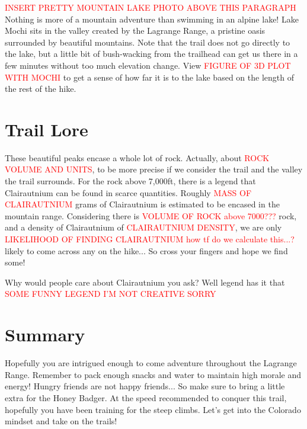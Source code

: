 \documentclass[12pt]{article}   %
\theoremstyle{definition}
\numberwithin{equation}{section}
\begin{document}
\quad \textcolor{red}{INSERT PRETTY MOUNTAIN LAKE PHOTO ABOVE THIS PARAGRAPH} Nothing is more of a mountain adventure than swimming in an alpine lake! Lake Mochi sits in the valley created by the Lagrange Range, a pristine oasis surrounded by beautiful mountains. Note that the trail does not go directly to the lake, but a little bit of bush-wacking from the trailhead can get us there in a few minutes without too much elevation change. View \textcolor{red}{FIGURE OF 3D PLOT WITH MOCHI} to get a sense of how far it is to the lake based on the length of the rest of the hike.
\section{Trail Lore} \label{APPM2350proj02sec05}

\quad These beautiful peaks encase a whole lot of rock. Actually, about \textcolor{red}{ROCK VOLUME AND UNITS}, to be more precise if we consider the trail and the valley the trail surrounds. For the rock above 7,000ft, there is a legend that Clairautnium can be found in scarce quantities. Roughly \textcolor{red}{MASS OF CLAIRAUTNIUM} grams of Clairautnium is estimated to be encased in the mountain range. Considering there is \textcolor{red}{VOLUME OF ROCK above 7000???} rock, and a density of Clairautnium of \textcolor{red}{CLAIRAUTNIUM DENSITY}, we are only \textcolor{red}{LIKELIHOOD OF FINDING CLAIRAUTNIUM how tf do we calculate this...?} likely to come across any on the hike... So cross your fingers and hope we find some!

\quad Why would people care about Clairautnium you ask? Well legend has it that \textcolor{red}{SOME FUNNY LEGEND I'M NOT CREATIVE SORRY}
\section{Summary} \label{APPM2350proj02sec06}

\quad Hopefully you are intrigued enough to come adventure throughout the Lagrange Range. Remember to pack enough snacks and water to maintain high morale and energy! Hungry friends are not happy friends... So make sure to bring a little extra for the Honey Badger. At the speed recommended to conquer this trail, hopefully you have been training for the steep climbs. Let's get into the Colorado mindset and take on the trails!
\end{document}
